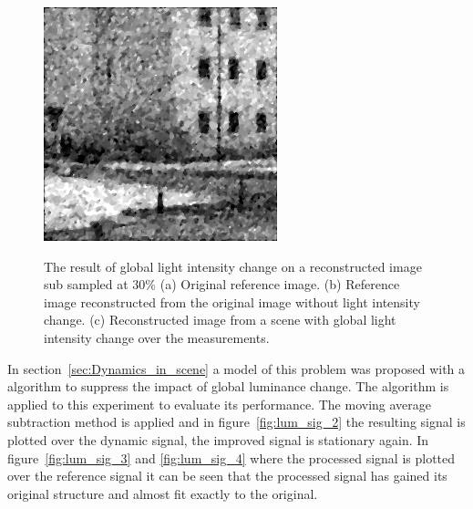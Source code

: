 \begin{figure}[H]
\begin{minipage}[t]{0.32\textwidth}
    \subcaption{}
    \label{fig:lum_2}
\end{minipage}
\begin{minipage}[t]{0.32\textwidth}
    \includegraphics[width = \textwidth]{result/dynamic/lum/intense_change_psnr_19_snr_14_sssim_38.png}
    \subcaption{}
    \label{fig:lum_3}
\end{minipage}
    \caption{The result of global light intensity change on a reconstructed image sub sampled at 30\% (a) Original reference image. (b) Reference image reconstructed from the original image without light intensity change. (c) Reconstructed image from a scene with global light intensity change over the measurements.}
    \label{fig:lum_dyn}
\end{figure}

In section~\ref{sec:Dynamics_in_scene} a model of this problem was proposed with a algorithm to suppress the impact of global luminance change. The algorithm is applied to this experiment to evaluate its performance. The moving average subtraction method is applied and in figure~\ref{fig:lum_sig_2} the resulting signal is plotted over the dynamic signal, the improved signal is stationary again. In figure~\ref{fig:lum_sig_3} and \ref{fig:lum_sig_4} where the processed signal is plotted over the reference signal it can be seen that the processed signal has gained its original structure and almost fit exactly to the original.


